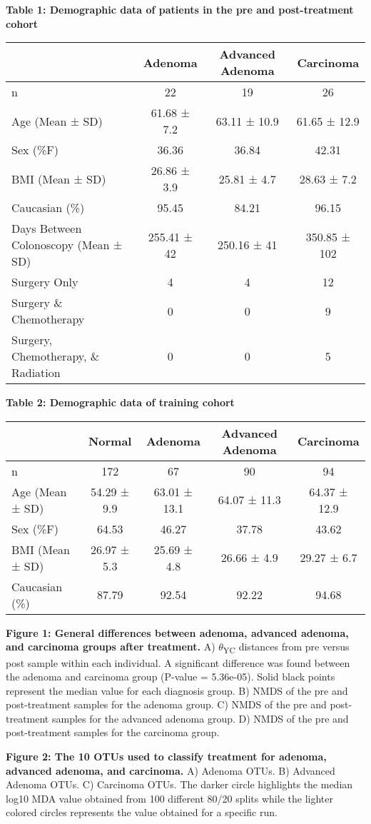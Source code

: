 \documentclass[12pt,]{article}
\providecommand{\DIFaddtex}[1]{{\protect\color{blue}\uwave{#1}}} %
\providecommand{\DIFaddbegin}{} %
\providecommand{\DIFaddend}{} %
\providecommand{\DIFadd}[1]{\texorpdfstring{\DIFaddtex{#1}}{#1}} %
\begin{document}
\newpage

\textbf{Table 1: Demographic data of patients in the pre and
post-treatment cohort}

\begin{longtable}[]{@{}lccc@{}}
\toprule
& Adenoma & Advanced Adenoma & Carcinoma\tabularnewline
\midrule
\endhead
n & 22 & 19 & 26\tabularnewline
Age (Mean ± SD) & 61.68 ± 7.2 & 63.11 ± 10.9 & 61.65 ±
12.9\tabularnewline
Sex (\%F) & 36.36 & 36.84 & 42.31\tabularnewline
BMI (Mean ± SD) & 26.86 ± 3.9 & 25.81 ± 4.7 & 28.63 ± 7.2\tabularnewline
Caucasian (\%) & 95.45 & 84.21 & 96.15\tabularnewline
Days Between Colonoscopy (Mean ± SD) & 255.41 ± 42 & 250.16 ± 41 &
350.85 ± 102\tabularnewline
Surgery Only & 4 & 4 & 12\tabularnewline
Surgery \& Chemotherapy & 0 & 0 & 9\tabularnewline
Surgery, Chemotherapy, \& Radiation & 0 & 0 & 5\tabularnewline
\bottomrule
\end{longtable}

\newpage

\textbf{Table 2: Demographic data of training cohort}

\begin{longtable}[]{@{}lcccc@{}}
\toprule
& Normal & Adenoma & Advanced Adenoma & Carcinoma\tabularnewline
\midrule
\endhead
n & 172 & 67 & 90 & 94\tabularnewline
Age (Mean ± SD) & 54.29 ± 9.9 & 63.01 ± 13.1 & 64.07 ± 11.3 & 64.37 ±
12.9\tabularnewline
Sex (\%F) & 64.53 & 46.27 & 37.78 & 43.62\tabularnewline
BMI (Mean ± SD) & 26.97 ± 5.3 & 25.69 ± 4.8 & 26.66 ± 4.9 & 29.27 ±
6.7\tabularnewline
Caucasian (\%) & 87.79 & 92.54 & 92.22 & 94.68\tabularnewline
\bottomrule
\end{longtable}

\newpage

\textbf{Figure 1: General differences between adenoma, advanced adenoma,
and carcinoma groups after treatment.} A) \(\theta\)\textsubscript{YC}
distances from pre versus post sample within each individual. A
significant difference was found between the adenoma and carcinoma group
(P-value = 5.36e-05). Solid black points represent the median value for
each diagnosis group. B) NMDS of the pre and post-treatment samples for
the adenoma group. C) NMDS of the pre and post-treatment samples for the
advanced adenoma group. D) NMDS of the pre and post-treatment samples
for the carcinoma group.

\textbf{Figure 2: The \DIFaddbegin \DIFadd{top }\DIFaddend 10 \DIFaddbegin \DIFadd{most important }\DIFaddend OTUs used to classify
treatment for adenoma, advanced adenoma, and carcinoma.} A) Adenoma
OTUs. B) Advanced Adenoma OTUs. C) Carcinoma OTUs. The darker circle
highlights the median log10 MDA value obtained from 100 different 80/20
splits while the lighter colored circles represents the value obtained
for a specific run.
\end{document}
